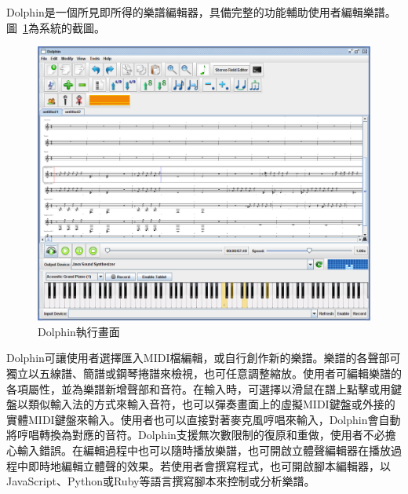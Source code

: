 \documentclass[12pt,a4paper,oneside]{report}
\begin{document}
Dolphin是一個所見即所得的樂譜編輯器，具備完整的功能輔助使用者編輯樂譜。圖~\ref{fig:screenshot}為系統的截圖。

\begin{figure}[htb]
\centering
\includegraphics[scale=0.3]{img/screenshot.png}
\caption{ Dolphin執行畫面}
\label{fig:screenshot}
\end{figure}

Dolphin可讓使用者選擇匯入MIDI檔編輯，或自行創作新的樂譜。樂譜的各聲部可獨立以五線譜、簡譜或鋼琴捲譜來檢視，也可任意調整縮放。使用者可編輯樂譜的各項屬性，並為樂譜新增聲部和音符。在輸入時，可選擇以滑鼠在譜上點擊或用鍵盤以類似輸入法的方式來輸入音符，也可以彈奏畫面上的虛擬MIDI鍵盤或外接的實體MIDI鍵盤來輸入。使用者也可以直接對著麥克風哼唱來輸入，Dolphin會自動將哼唱轉換為對應的音符。Dolphin支援無次數限制的復原和重做，使用者不必擔心輸入錯誤。在編輯過程中也可以隨時播放樂譜，也可開啟立體聲編輯器在播放過程中即時地編輯立體聲的效果。若使用者會撰寫程式，也可開啟腳本編輯器，以JavaScript、Python或Ruby等語言撰寫腳本來控制或分析樂譜。
\end{document}
